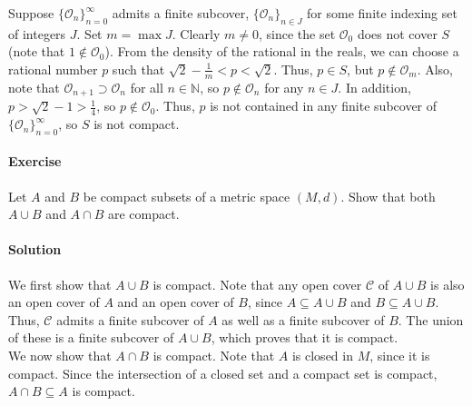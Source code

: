 \documentclass[10pt]{article}
\newcounter{prob}
\def\problem{\stepcounter{prob}\paragraph{Exercise \arabic{prob}}}
\def\solution{\paragraph{Solution}}
\def\O{\mathcal{O}}
\begin{document}
        Suppose $\{\O_n\}_{n = 0}^\infty$ admits a finite subcover, $\{\O_n\}_{n \in J}$ for some finite indexing set
        of integers $J$. Set $m = \max{J}$. Clearly $m \neq 0$, since the set $\O_0$ does not cover $S$ (note that $1 \notin \O_0$).
        From the density of the rational in the reals, we can choose a rational number $p$ such that
        $\sqrt{2} - \frac{1}{m} < p < \sqrt{2}$. Thus, $p \in S$, but $p \notin \O_m$. Also, note that 
        $\O_{n + 1} \supset \O_{n}$ for all $n \in \mathbb{N}$, so $p \notin \O_n$ for any $n \in J$.
        In addition, $p > \sqrt{2} - 1 > \frac{1}{4}$, so $p \notin \O_0$. Thus, $p$ is not contained in any finite subcover
        of $\{\O_n\}_{n = 0}^\infty$, so $S$ is not compact.



        \problem Let $A$ and $B$ be compact subsets of a metric space $(M, d)$. Show that both $A \cup B$ and $A \cap B$ are compact.

        \solution We first show that $A \cup B$ is compact.
        Note that any open cover $\mathcal{C}$ of $A \cup B$ is also an open cover of $A$ and an open cover of $B$, since $A \subseteq A \cup B$
        and $B \subseteq A \cup B$. Thus, $\mathcal{C}$ admits a finite subcover of $A$ as well as a finite subcover of $B$.
        The union of these is a finite subcover of $A \cup B$, which proves that it is compact. \\

        We now show that $A \cap B$ is compact. Note that $A$ is closed in $M$, since it is compact.
        Since the intersection of a closed set and a compact set is compact, $A \cap B \subseteq A$ is compact.
\end{document}
